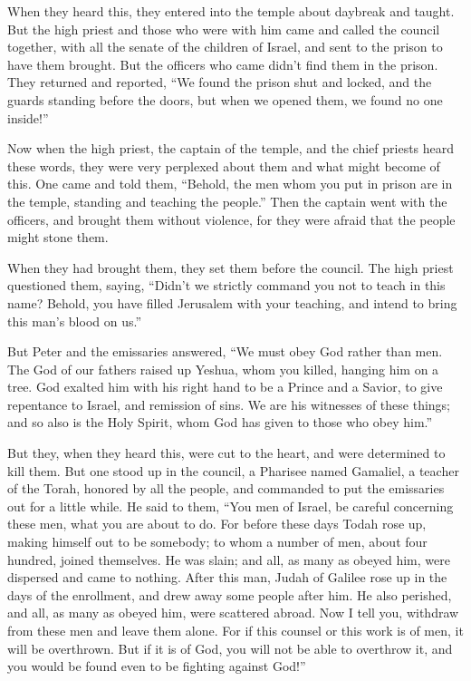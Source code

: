 \myverse{}When they heard this, they entered into the temple about daybreak
and taught. But the high priest and those who were with him came and called the council together, with
all the senate of the children of Israel, and sent to the prison to have them brought.
\myverse{}But the officers who came didn’t find them in the prison. They returned and
reported,
\myverse{}“We found the prison shut and locked, and the guards standing before the doors,
but when we opened them, we found no one inside!”

\myverse{}Now when the high priest, the captain of the temple, and the
chief priests heard these words, they were very perplexed about them and what might become of this.
\myverse{}One came and told them, “Behold, the men whom you put in prison are in the
temple, standing and teaching the people.”
\myverse{}Then the captain went with the officers, and brought them without violence,
for they were afraid that the people might stone them.

\myverse{}When they had brought them, they set them before the council.
The high priest questioned them,
\myverse{}saying, “Didn’t we strictly command you not to teach in this name? Behold,
you have filled Jerusalem with your teaching, and intend to bring this man’s blood on us.”

\myverse{}But Peter and the emissaries answered, “We must obey God rather
than men.
\myverse{}The God of our fathers raised up Yeshua, whom you killed, hanging him on a
tree.
\myverse{}God exalted him with his right hand to be a Prince and a Savior, to give repentance
to Israel, and remission of sins.
\myverse{}We are his witnesses of these things; and so also is the Holy Spirit, whom
God has given to those who obey him.”

\myverse{}But they, when they heard this, were cut to the heart, and were
determined to kill them.
\myverse{}But one stood up in the council, a Pharisee named Gamaliel, a teacher of the Torah,
honored by all the people, and commanded to put the emissaries out for a little while.
\myverse{}He said to them, “You men of Israel, be careful concerning these men, what
you are about to do.
\myverse{}For before these days Todah rose up, making himself out to be somebody; to
whom a number of men, about four hundred, joined themselves. He was slain; and all, as many as obeyed
him, were dispersed and came to nothing.
\myverse{}After this man, Judah of Galilee rose up in the days of the enrollment, and
drew away some people after him. He also perished, and all, as many as obeyed him, were scattered abroad.
\myverse{}Now I tell you, withdraw from these men and leave them alone. For if this
counsel or this work is of men, it will be overthrown.
\myverse{}But if it is of God, you will not be able to overthrow it, and you would be
found even to be fighting against God!”

